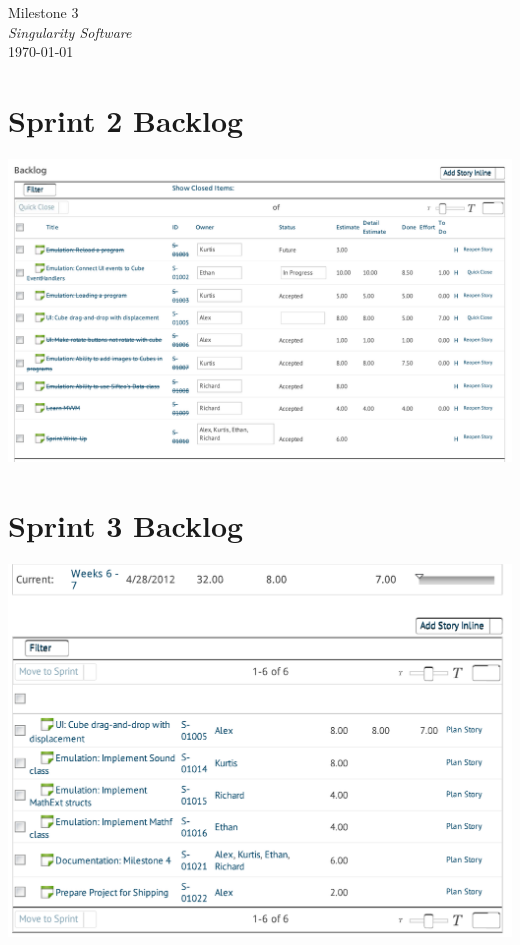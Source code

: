 \documentclass[12pt]{article}
\begin{document}
\begin{center}
	\LARGE{Milestone 3} \\
	\Large{\textit{Singularity Software}} \\
	\vspace{.05in}
	\normalsize{\today} \\
\end{center}

\section*{Sprint 2 Backlog}
\includegraphics[scale=.63]{pdfs/MS2VersionOne/OldSprintBacklog_cropped.pdf}

\clearpage

\section*{Sprint 3 Backlog}
\includegraphics[scale=.85]{pdfs/MS3VersionOne/NewSprintBacklog_cropped.pdf}
\end{document}
